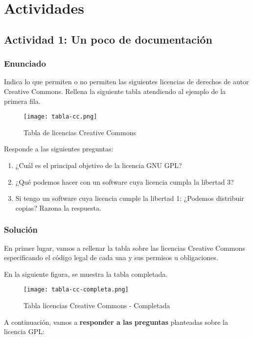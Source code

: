 \section{Actividades}
\subsection{Actividad 1: Un poco de documentación}
\subsubsection{Enunciado}
Indica lo que permiten o no permiten las siguientes licencias de derechos de autor Creative Commons. Rellena la siguiente tabla atendiendo al ejemplo de la primera fila.

\begin{figure}[H]
    \centering
    \texttt{[image: tabla-cc.png]}
    \caption{Tabla de licencias Creative Commons}
\end{figure}

Responde a las siguientes preguntas:

\begin{enumerate}[label=\alph*.]
    \item ¿Cuál es el principal objetivo de la licencia GNU GPL?
    \item ¿Qué podemos hacer con un software cuya licencia cumpla la libertad 3?
    \item Si tengo un software cuya licencia cumple la libertad 1: ¿Podemos distribuir copias? Razona la respuesta.
\end{enumerate}

\subsubsection{Solución}
En primer lugar, vamos a rellenar la tabla sobre las licencias Creative Commons especificando el código legal de cada una y sus permisos u obligaciones.

En la siguiente figura, se muestra la tabla completada.

\begin{figure}[H]
    \centering
    \texttt{[image: tabla-cc-completa.png]}
    \caption{Tabla licencias Creative Commons - Completada}
\end{figure}

A continuación, vamos a \textbf{responder a las preguntas} planteadas sobre la licencia GPL:

